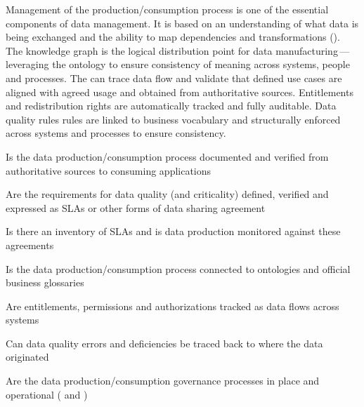 %
%

\ekgmmContextSection

Management of the production/consumption process is one of the essential components of data management.
It is based on an understanding of what data is being exchanged and the ability to map dependencies and
transformations ().
The knowledge graph is the logical distribution point for data manufacturing\,---\,leveraging the ontology to ensure
consistency of meaning across systems, people and processes.
The  can trace data flow and validate that defined use cases are aligned with agreed usage and
obtained from authoritative sources.
Entitlements and redistribution rights are automatically tracked and fully auditable.
Data quality rules rules are linked to business vocabulary and structurally enforced
across systems and processes to ensure consistency.

\ekgmmcorequestionssection

\begin{core-questions}

  \item [\thesection.1] Is the data production/consumption process documented and verified from authoritative sources
                        to consuming applications
  \item [\thesection.2] Are the requirements for data quality (and criticality) defined, verified and expressed as SLAs
                        or other forms of data sharing agreement
  \item [\thesection.3] Is there an inventory of SLAs and is data production monitored against these agreements
  \item [\thesection.4] Is the data production/consumption process connected to ontologies and
                        official business glossaries
  \item [\thesection.5] Are entitlements, permissions and authorizations tracked as data flows across systems
  \item [\thesection.6] Can data quality errors and deficiencies be traced back to where the data originated
  \item [\thesection.7] Are the data production/consumption governance processes in place and operational
                        ( and )

\end{core-questions}

